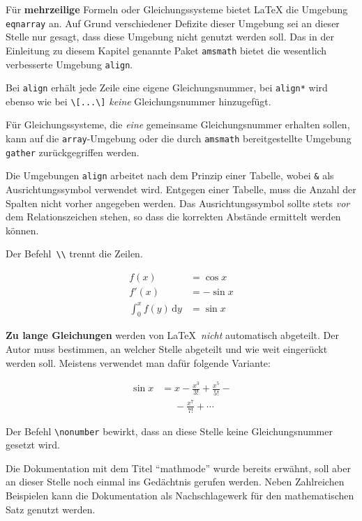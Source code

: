 Für \textbf{mehrzeilige} Formeln oder Gleichungssysteme bietet \LaTeX{} die
Umgebung \texttt{eqnarray} an. Auf Grund verschiedener Defizite dieser
Umgebung sei an dieser Stelle nur gesagt, dass diese Umgebung nicht genutzt
werden soll. Das in der Einleitung zu diesem Kapitel genannte Paket
\texttt{amsmath} bietet die wesentlich verbesserte Umgebung \texttt{align}.

Bei \texttt{align} erhält jede Zeile eine eigene
Gleichungsnummer, bei \texttt{align*} wird ebenso wie bei
\lstinline|\[...\]| \emph{keine} Gleichungsnummer hinzugefügt.

Für Gleichungssysteme, die \emph{eine} gemeinsame Gleichungsnummer
erhalten sollen, kann auf die \texttt{array}-Umgebung oder die durch \texttt{amsmath}
bereitgestellte Umgebung \texttt{gather} zurückgegriffen werden.

Die Umgebungen \texttt{align} arbeitet nach dem Prinzip einer Tabelle, wobei \texttt{\&} als
Ausrichtungssymbol verwendet wird. Entgegen einer Tabelle, muss die Anzahl der Spalten nicht vorher 
angegeben werden. Das Ausrichtungssymbol sollte stets \emph{vor} dem Relationszeichen stehen, so
dass die korrekten Abstände ermittelt werden können. 

Der Befehl~\lstinline|\\| trennt die Zeilen.
\begin{LTXexample}
\begin{align}
f(x) & =  \cos x       \\
f'(x) & =  -\sin x     \\
\int_{0}^{x} f(y)\,\mathrm{d}y &
 =  \sin x
\end{align}
\end{LTXexample}


 
\textbf{Zu lange Gleichungen} werden von \LaTeX\ \textit{nicht}
automatisch abgeteilt.
Der Autor muss bestimmen, an welcher Stelle abgeteilt und wie
weit eingerückt werden soll.
Meistens verwendet man dafür folgende Variante:

\begin{LTXexample}
\begin{align}
\sin x & =  x -\frac{x^{3}}{3!}
     +\frac{x^{5}}{5!} - {} 
                    \nonumber\\
 &\mathrel{\phantom{=}} 
  -\frac{x^{7}}{7!} + \cdots
\end{align}
\end{LTXexample}

Der Befehl \lstinline|\nonumber| bewirkt, dass an diese Stelle keine
Gleichungsnummer gesetzt wird.

Die Dokumentation mit dem Titel \enquote{mathmode} wurde bereits erwähnt, soll aber an dieser Stelle
noch einmal ins Gedächtnis gerufen werden. Neben Zahlreichen Beispielen kann
die Dokumentation als Nachschlagewerk für den mathematischen Satz genutzt werden.

\endinput
